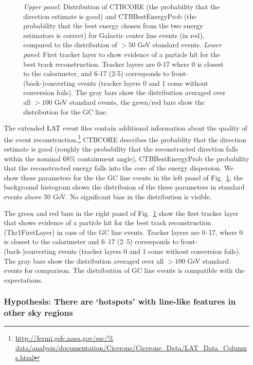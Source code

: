 \documentclass[aps,twocolumn,prd,superscriptaddress,showpacs,nofootinbib,fixfloat]{revtex4}
\begin{document}
\begin{figure}
  \caption{\emph{Upper panel:} Distribution of CTBCORE (the probability that
  the direction estimate is good) and CTBBestEnergyProb (the probability that
  the best energy chosen from the two energy estimators is correct) for
  Galactic center line events (in red), compared to the distribution of $>50$
  GeV standard events.  \emph{Lower panel}: First tracker layer to show
  evidence of a particle hit for the best track reconstruction. Tracker layers
  are 0-17 where 0 is closest to the calorimeter, and 6-17 (2-5) corresponds
  to front- (back-)converting events (tracker layers 0 and 1 come without
  conversion foils). The gray bars show the distribution averaged over all
  $>100$ GeV standard events, the green/red bars show the distribution for the
  GC line.}
  \label{fig:CTBquality}
\end{figure}

The extended LAT event files contain additional information about the quality
of the event reconstruction.\footnote{\url{http://fermi.gsfc.nasa.gov/ssc/%
data/analysis/documentation/Cicerone/Cicerone\_Data/LAT\_Data\_Columns.html}}
CTBCORE describes the probablity that the direction estimate is good (roughly
the probability that the reconstructed direction falls within the nominal 68\%
containment angle), CTBBestEnergyProb the probability that the reconstructed
energy falls into the core of the energy dispersion. We show these parameters
for the the GC line events in the left panel of Fig.~\ref{fig:CTBquality}; the
background histogram shows the distribuion of the these parameters in standard
events above 50 GeV. No significant bias in the distribution is visible.

The green and red bars in the right panel of Fig.~\ref{fig:CTBquality} show
the first tracker layer that shows evidence of a particle hit for the best
track reconstruction (Tkr1FirstLayer) in case of the GC line events.  Tracker
layers are 0--17, where 0 is closest to the calorimeter and 6--17 (2--5)
corresponds to front- (back-)converting events (tracker layers 0 and 1 come
without conversion foils). The gray bars show the distribution averaged over
all $>100$ GeV standard events for comparison. The distribution of GC line
events is compatible with the expectations.

\subsubsection{Hypothesis: There are `hotspots' with line-like features
in other sky regions}
\end{document}
